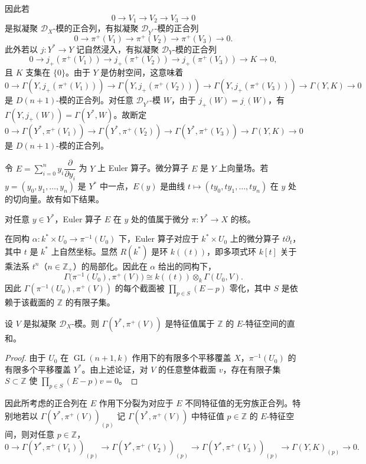 因此若
$$0\longrightarrow V_1\longrightarrow V_2\longrightarrow V_3\longrightarrow 0$$
是拟凝聚 $\mathcal{D}_X$-模的正合列，有拟凝聚 $\mathcal{D}_{Y^*}$-模的正合列
$$0\longrightarrow\pi^+(V_1)\longrightarrow\pi^+(V_2)\longrightarrow\pi^+(V_3)\longrightarrow 0.$$
此外若以 $j:Y^*\to Y$ 记自然浸入，有拟凝聚 $\mathcal{D}_Y$-模的正合列
$$0\longrightarrow j_+(\pi^+(V_1))\longrightarrow j_+(\pi^+(V_2))\longrightarrow j_+(\pi^+(V_3))\longrightarrow K\longrightarrow 0,$$
且 $K$ 支集在 $\{0\}$。由于 $Y$ 是仿射空间，这意味着
$$0\to\Gamma(Y,j_+(\pi^+(V_1)))\to\Gamma(Y,j_+(\pi^+(V_2)))\to\Gamma(Y,j_+(\pi^+(V_3)))\to\Gamma(Y,K)\to 0$$
是 $D(n+1)$-模的正合列。对任意 $\mathcal{D}_{Y^*}$-模 $W$，由于 $j_+(W)=j_\cdot(W)$，有 $\Gamma(Y,j_+(W))=\Gamma(Y^*,W)$。故断定
$$0\to\Gamma(Y^*,\pi^+(V_1))\to\Gamma(Y^*,\pi^+(V_2))\to\Gamma(Y^*,\pi^+(V_3))\to\Gamma(Y,K)\to 0$$
是 $D(n+1)$-模的正合列。

令 $E=\sum_{i=0}^ny_i\dfrac{\partial}{\partial y_i}$ 为 $Y$ 上 Euler 算子。微分算子 $E$ 是 $Y$ 上向量场。若 $y=(y_0,y_1,\dots,y_n)$ 是 $Y^*$ 中一点，$E(y)$ 是曲线 $t\longmapsto(ty_0,ty_1,\dots,ty_n)$ 在 $y$ 处的切向量。故有如下结果。

\begin{lemma}
对任意 $y\in Y^*$，Euler 算子 $E$ 在 $y$ 处的值属于微分 $\pi:Y^*\to X$ 的核。
\end{lemma}

在同构 $\alpha:k^*\times U_0\to\pi^{-1}(U_0)$ 下，Euler 算子对应于 $k^*\times U_0$ 上的微分算子 $t\partial_t$，其中 $t$ 是 $k^*$ 上自然坐标。显然 $R(k^*)$ 是环 $k((t))$，即多项式环 $k[t]$ 关于乘法系 $t^n$（$n\in\mathbb{Z}_+$）的局部化。因此在 $\alpha$ 给出的同构下，
$$\Gamma\bigl(\pi^{-1}(U_0),\pi^+(V)\bigr)\cong k((t))\otimes_k\Gamma(U_0,V).$$
因此 $\Gamma(\pi^{-1}(U_0),\pi^+(V))$ 的每个截面被 $\prod_{p\in S}(E-p)$ 零化，其中 $S$ 是依赖于该截面的 $\mathbb{Z}$ 的有限子集。

\begin{lemma}
设 $V$ 是拟凝聚 $\mathcal{D}_X$-模。则 $\Gamma(Y^*,\pi^+(V))$ 是特征值属于 $\mathbb{Z}$ 的 $E$-特征空间的直和。
\end{lemma}

\begin{proof}
由于 $U_0$ 在 $\operatorname{GL}(n+1,k)$ 作用下的有限多个平移覆盖 $X$，$\pi^{-1}(U_0)$ 的有限多个平移覆盖 $Y^*$。由上述论证，对 $V$ 的任意整体截面 $v$，存在有限子集 $S\subset\mathbb{Z}$ 使 $\prod_{p\in S}(E-p)v=0$。
\end{proof}

因此所考虑的正合列在 $E$ 作用下分裂为对应于 $E$ 不同特征值的无穷族正合列。特别地若以 $\Gamma(Y^*,\pi^+(V))_{(p)}$ 记 $\Gamma(Y^*,\pi^+(V))$ 中特征值 $p\in\mathbb{Z}$ 的 $E$-特征空间，则对任意 $p\in\mathbb{Z}$，
$$0\to\Gamma(Y^*,\pi^+(V_1))_{(p)}\to\Gamma(Y^*,\pi^+(V_2))_{(p)}\to\Gamma(Y^*,\pi^+(V_3))_{(p)}\to\Gamma(Y,K)_{(p)}\to 0.$$

